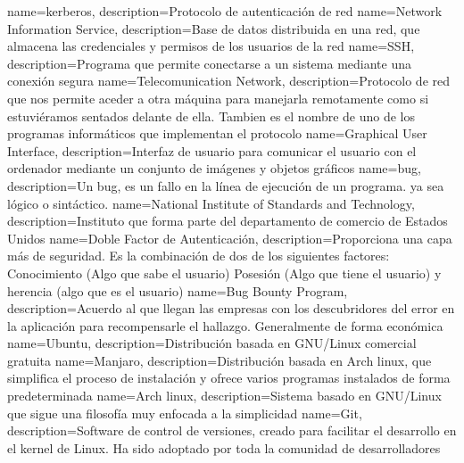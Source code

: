 {
	name=kerberos,
	description={Protocolo de autenticación de red}
}
{
	name=Network Information Service,
	description={Base de datos distribuida en una red, que almacena las credenciales y permisos de los usuarios de la red}
}
{
	name=SSH,
	description={Programa que permite conectarse a un sistema mediante una conexión segura}
}
{
	name=Telecomunication Network,
	description={Protocolo de red que nos permite aceder a otra máquina para manejarla remotamente como si estuviéramos sentados delante de ella. Tambien es el nombre de uno de los programas informáticos que implementan el protocolo}
}
{
	name=Graphical User Interface,
	description={Interfaz de usuario para comunicar el usuario con el ordenador mediante un conjunto de imágenes y objetos gráficos}
}
{
	name=bug,
	description={Un bug, es un fallo en la línea de ejecución de un programa. ya sea lógico o sintáctico.}
}
{
	name=National Institute of Standards and Technology,
	description={Instituto que forma parte del departamento de comercio de Estados Unidos}
}
{
	name=Doble Factor de Autenticación,
	description={Proporciona una capa más de seguridad. Es la combinación de dos de los siguientes factores: Conocimiento (Algo que sabe el usuario) Posesión (Algo que tiene el usuario) y herencia (algo que es el usuario)}
}
{
	name=Bug Bounty Program,
	description={Acuerdo al que llegan las empresas con los descubridores del error en la aplicación para recompensarle el hallazgo. Generalmente de forma económica}
}
{
	name=Ubuntu,
	description={Distribución basada en GNU/Linux comercial gratuita}
}
{
	name=Manjaro,
	description={Distribución basada en Arch linux, que simplifica el proceso de instalación y ofrece varios programas instalados de forma predeterminada}
}
{
	name=Arch linux,
	description={Sistema basado en GNU/Linux que sigue una filosofía muy enfocada a la simplicidad}
}
{
	name=Git,
	description={Software de control de versiones, creado para facilitar el desarrollo en el kernel de Linux. Ha sido adoptado por toda la comunidad de desarrolladores}
}
